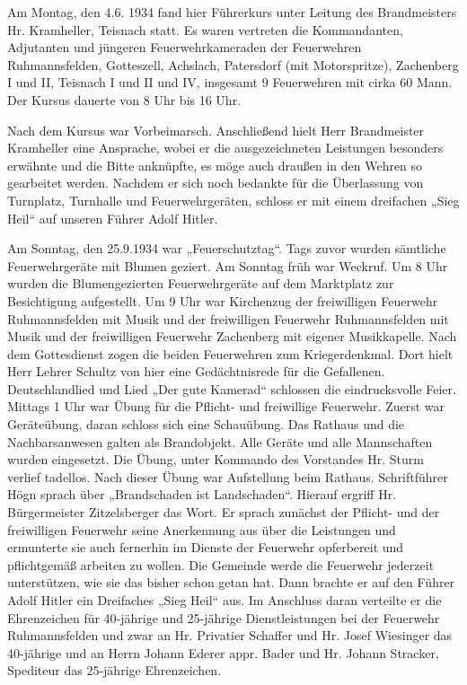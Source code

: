 \documentclass[12pt,a4paper]{book}
\begin{document}
Am Montag, den 4.6. 1934 fand hier Führerkurs unter Leitung des Brandmeisters
Hr. Kramheller, Teisnach statt. Es waren vertreten die Kommandanten, Adjutanten
und jüngeren Feuerwehrkameraden der Feuerwehren Ruhmannsfelden, Gotteszell,
Achslach, Patersdorf (mit Motorspritze), Zachenberg I und II, Teisnach I und II
und IV, insgesamt 9 Feuerwehren mit cirka 60 Mann. Der Kursus dauerte von 8 Uhr
bis 16 Uhr.

Nach dem Kursus war Vorbeimarsch. Anschließend hielt Herr Brandmeister
Kramheller eine Ansprache, wobei er die ausgezeichneten Leistungen besonders
erwähnte und die Bitte anknüpfte, es möge auch draußen in den Wehren so
gearbeitet werden. Nachdem er sich noch bedankte für die Überlassung von
Turnplatz, Turnhalle und Feuerwehrgeräten, schloss er mit einem dreifachen „Sieg
Heil“ auf unseren Führer Adolf Hitler.

Am Sonntag, den 25.9.1934 war „Feuerschutztag“. Tags zuvor wurden sämtliche
Feuerwehrgeräte mit Blumen geziert. Am Sonntag früh war Weckruf. Um 8 Uhr wurden
die Blumengezierten Feuerwehrgeräte auf dem Marktplatz zur Besichtigung
aufgestellt. Um 9 Uhr war Kirchenzug der freiwilligen Feuerwehr Ruhmannsfelden
mit Musik und der freiwilligen Feuerwehr Ruhmannsfelden mit Musik und der
freiwilligen Feuerwehr Zachenberg mit eigener Musikkapelle. Nach dem
Gottesdienst zogen die beiden Feuerwehren zum Kriegerdenkmal. Dort hielt Herr
Lehrer Schultz von hier eine Gedächtnisrede für die Gefallenen. Deutschlandlied
und Lied „Der gute Kamerad“ schlossen die eindrucksvolle Feier. Mittags 1 Uhr
war Übung für die Pflicht- und freiwillige Feuerwehr. Zuerst war Geräteübung,
daran schloss sich eine Schauübung. Das Rathaus und die Nachbarsanwesen galten
als Brandobjekt. Alle Geräte und alle Mannschaften wurden eingesetzt. Die Übung,
unter Kommando des Vorstandes Hr. Sturm verlief tadellos. Nach dieser Übung war
Aufstellung beim Rathaus. Schriftführer Högn sprach über „Brandschaden ist
Landschaden“. Hierauf ergriff Hr. Bürgermeister Zitzelsberger das Wort. Er
sprach zunächst der Pflicht- und der freiwilligen Feuerwehr seine Anerkennung
aus über die Leistungen und ermunterte sie auch fernerhin im Dienste der
Feuerwehr opferbereit und pflichtgemäß arbeiten zu wollen. Die Gemeinde werde
die Feuerwehr jederzeit unterstützen, wie sie das bisher schon getan hat. Dann
brachte er auf den Führer Adolf Hitler ein Dreifaches „Sieg Heil“ aus. Im
Anschluss daran verteilte er die Ehrenzeichen für 40-jährige und 25-jährige
Dienstleistungen bei der Feuerwehr Ruhmannsfelden und zwar an Hr. Privatier
Schaffer und Hr. Josef Wiesinger das 40-jährige und an Herrn Johann Ederer appr.
Bader und Hr. Johann Stracker, Spediteur das 25-jährige Ehrenzeichen.
\end{document}
